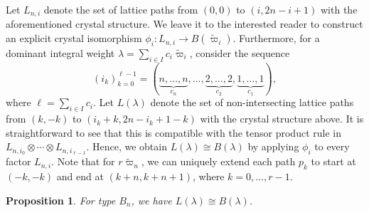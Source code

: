\documentclass[11pt, leqno]{amsart}
\theoremstyle{plain}
\newtheorem{proposition}[theorem]{Proposition}
\theoremstyle{definition}
\numberwithin{equation}{section}
\newcommand{\iso}{\cong} %
\newcommand{\fw}{\varpi} %
\newcommand{\tfw}{\widetilde{\fw}} %
\begin{document}
Let $L_{n,i}$ denote the set of lattice paths from $(0,0)$ to $(i, 2n-i+1)$ with the aforementioned crystal structure.
We leave it to the interested reader to construct an explicit crystal isomorphism $\phi_i \colon L_{n,i} \to B(\tfw_i)$.
Furthermore, for a dominant integral weight $\lambda = \sum_{i \in I} c_i \tfw_i$, consider the sequence
\[
(i_k)_{k=0}^{\ell-1} = (\underbrace{n,\dotsc,n}_{c_n}, \dotsc, \underbrace{2,\dotsc,2}_{c_2}, \underbrace{1,\dotsc,1}_{c_1}),
\]
where $\ell = \sum_{i \in I} c_i$.
Let $L(\lambda)$ denote the set of non-intersecting lattice paths from $(k,-k)$ to $(i_k+k, 2n-i_k+1-k)$ with the crystal structure above. It is straightforward to see that this is compatible with the tensor product rule in $L_{n,i_0} \otimes \cdots \otimes L_{n,i_{\ell-1}}$. Hence, we obtain $L(\lambda) \iso B(\lambda)$ by applying $\phi_i$ to every factor $L_{n,i}$. Note that for $r \tfw_n$, we can uniquely extend each path $p_k$ to start at $(-k,-k)$ and end at $(k+n,k+n+1)$, where $k = 0, \dotsc, r-1$.

\begin{proposition}
\label{prop:NILP_model}
For type $B_n$, we have $L(\lambda) \iso B(\lambda)$.
\end{proposition}

\newcommand{\board}{
\clip (-0.65,-5.65) rectangle (6.65, 0.65);
\foreach \y in {1,2,3,4} {
  \draw (0, \y-4+0.2) node {$\ddots$};
}
\foreach \y in {5,6} {
  \draw (6, \y-10+0.2) node {$\ddots$};
}
\draw[step=1,xshift=0.5cm,yshift=0.5cm,very thin,gray!40] (-3,2) grid (7,-7);
\foreach \x in {1,...,5} {
  \foreach \i in {1,2,3} {
    \draw (\x,3-\i-\x) node {$\i$};
    \draw (\x,-4+\i-\x) node {$\i$};
  }
}
} %
\end{document}
